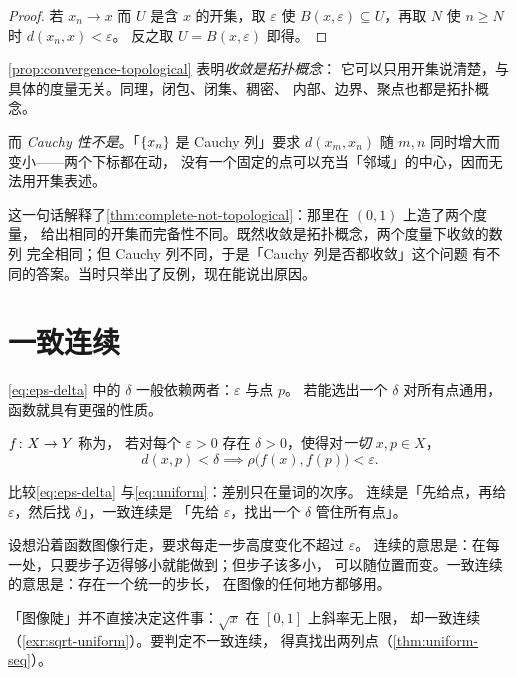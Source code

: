 \begin{proof}
  若 \(x_{n} \to x\) 而 \(U\) 是含 \(x\) 的开集，取 \(\varepsilon\) 使
  \(B(x,\varepsilon) \subseteq U\)，再取 \(N\) 使 \(n \ge N\) 时 \(d(x_{n},x)<\varepsilon\)。
  反之取 \(U = B(x,\varepsilon)\) 即得。
\end{proof}

\begin{remark}[对第 2 章完备性反例的解释]
  \cref{prop:convergence-topological} 表明\emph{收敛是拓扑概念}：
  它可以只用开集说清楚，与具体的度量无关。同理，闭包、闭集、稠密、
  内部、边界、聚点也都是拓扑概念。

  而 \emph{Cauchy 性不是}。「\(\{x_{n}\}\) 是 Cauchy 列」要求
  \(d(x_{m},x_{n})\) 随 \(m,n\) 同时增大而变小——两个下标都在动，
  没有一个固定的点可以充当「邻域」的中心，因而无法用开集表述。

  这一句话解释了\cref{thm:complete-not-topological}：那里在 \((0,1)\) 上造了两个度量，
  给出相同的开集而完备性不同。既然收敛是拓扑概念，两个度量下收敛的数列
  完全相同；但 Cauchy 列不同，于是「Cauchy 列是否都收敛」这个问题
  有不同的答案。当时只举出了反例，现在能说出原因。
\end{remark}

\section{一致连续}
\label{sec:uniform}

\cref{eq:eps-delta} 中的 \(\delta\) 一般依赖两者：\(\varepsilon\) 与点 \(p\)。
若能选出一个 \(\delta\) 对所有点通用，函数就具有更强的性质。

\begin{definition}[一致连续]
  \label{def:uniform-continuous}
  \(f \colon X \to Y\) 称为，
  若对每个 \(\varepsilon>0\) 存在 \(\delta>0\)，使得对\emph{一切} \(x, p \in X\)，
  \begin{equation}
    \label{eq:uniform}
    d(x,p) < \delta \implies \rho\bigl(f(x),f(p)\bigr) < \varepsilon .
  \end{equation}
\end{definition}

比较\cref{eq:eps-delta} 与\cref{eq:uniform}：差别只在量词的次序。
连续是「先给点，再给 \(\varepsilon\)，然后找 \(\delta\)」，一致连续是
「先给 \(\varepsilon\)，找出一个 \(\delta\) 管住所有点」。

\begin{intuition}
  设想沿着函数图像行走，要求每走一步高度变化不超过 \(\varepsilon\)。
  连续的意思是：在每一处，只要步子迈得够小就能做到；但步子该多小，
  可以随位置而变。一致连续的意思是：存在一个统一的步长，
  在图像的任何地方都够用。

  「图像陡」并不直接决定这件事：\(\sqrt{x}\) 在 \([0,1]\) 上斜率无上限，
  却一致连续（\cref{exr:sqrt-uniform}）。要判定不一致连续，
  得真找出两列点（\cref{thm:uniform-seq}）。
\end{intuition}

